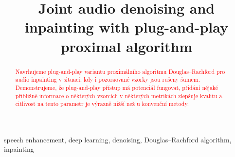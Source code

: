\documentclass[conference]{IEEEtran}
\newcommand{\todo}[1]{\textcolor{red}{#1}}
\begin{document}

\title{Joint audio denoising and inpainting with plug-and-play proximal algorithm}

\author{
\and
{}
}

\maketitle

\begin{abstract}
\todo{Navrhujeme plug-and-play variantu proximálního algoritmu Douglas--Rachford pro audio inpainting v situaci, kdy i pozoraované vzorky jsou rušeny šumem.
Demonstrujeme, že plug-and-play přístup má potenciál fungovat, přidání nějaké přibližné informace o některých vzorcích v některých metrikách zlepšuje kvalitu a citlivost na tento parametr je výrazně nižší než u konvenční metody.}
\end{abstract}

\begin{IEEEkeywords}
speech enhancement, deep learning, denoising, Douglas--Rachford algorithm, inpainting
\end{IEEEkeywords}
\end{document}
